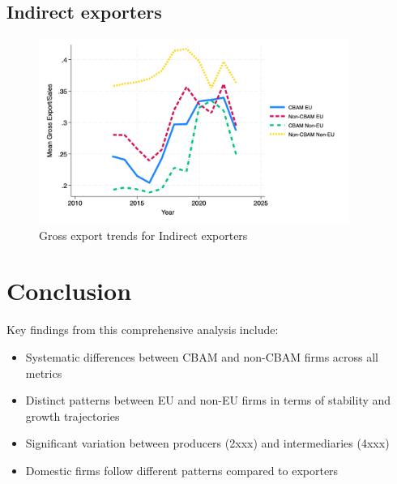 \documentclass{article}
\begin{document}
\subsection{Indirect exporters}
\begin{figure}[h!]
\centering
\includegraphics[width=0.9\textwidth]{gross_in.png}
\caption{Gross export trends for Indirect exporters}
\label{fig:gross_in}
\end{figure}

\section{Conclusion}
Key findings from this comprehensive analysis include:
\begin{itemize}
\item Systematic differences between CBAM and non-CBAM firms across all metrics
\item Distinct patterns between EU and non-EU firms in terms of stability and growth trajectories
\item Significant variation between producers (2xxx) and intermediaries (4xxx)
\item Domestic firms follow different patterns compared to exporters
\end{itemize}
\end{document}
